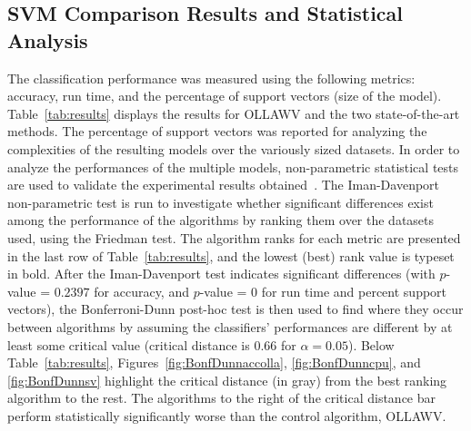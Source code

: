 \documentclass[reqno]{vcuthesis}
\numberwithin{equation}{chapter}
\begin{document}
\begin{table}[t!]
\begin{minipage}{0.3\textwidth}
{}
\captionsetup{width=0.95\linewidth}
\label{fig:BonfDunnsv}
\end{minipage}
\end{table}

\subsection{SVM Comparison Results and Statistical Analysis}\label{subsec:ollawvresults}
The classification performance was measured using the following metrics: accuracy, run time, and the percentage of support vectors (size of the model). Table~\ref{tab:results} displays the results for OLLAWV and the two state-of-the-art methods. The percentage of support vectors was reported for analyzing the complexities of the resulting models over the variously sized datasets. In order to analyze the performances of the multiple models, non-parametric statistical tests are used to validate the experimental results obtained~\cite{Derrac2011}. The Iman-Davenport non-parametric test is run to investigate whether significant differences exist among the performance of the algorithms by ranking them over the datasets used, using the Friedman test. The algorithm ranks for each metric are presented in the last row of Table~\ref{tab:results}, and the lowest (best) rank value is typeset in bold. After the Iman-Davenport test indicates significant differences (with $p$-value =  $0.2397$ for accuracy, and $p$-value =  $0$ for run time and percent support vectors), the Bonferroni-Dunn post-hoc test is then used to find where they occur between algorithms by assuming the classifiers' performances are different by at least some critical value (critical distance is $0.66$ for $\alpha = 0.05$). Below Table~\ref{tab:results}, Figures~\ref{fig:BonfDunnaccolla}, \ref{fig:BonfDunncpu}, and \ref{fig:BonfDunnsv} highlight the critical distance (in gray) from the best ranking algorithm to the rest. The algorithms to the right of the critical distance bar perform statistically significantly worse than the control algorithm, OLLAWV.
\end{document}
